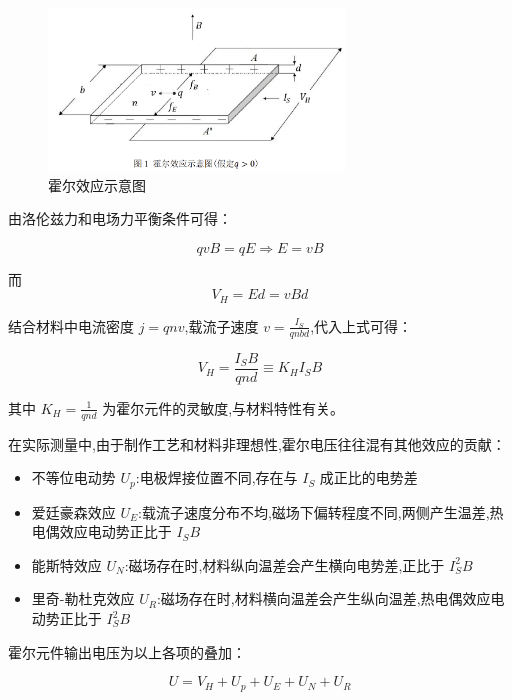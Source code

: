 \documentclass[UTF8]{ctexart}
\begin{document}
    \begin{figure}[htbp]
    \centering
    \includegraphics[width=0.7\textwidth]{hall_effect.png}
    \caption{霍尔效应示意图}
    \label{fig:hall_effect}
    \end{figure}
    
    由洛伦兹力和电场力平衡条件可得：
    
    \begin{equation}
    qvB = qE \Rightarrow E=vB
    \end{equation}
    
    而
    \begin{equation}
    V_H = Ed = vBd
    \end{equation}
    
    结合材料中电流密度 $j=qnv$,载流子速度 $v=\frac{I_S}{qnbd}$,代入上式可得：
    
    \begin{equation}
    V_H = \frac{I_SB}{qnd} \equiv K_HI_SB
    \end{equation}
    
    其中 $K_H=\frac{1}{qnd}$ 为霍尔元件的灵敏度,与材料特性有关。
    
    在实际测量中,由于制作工艺和材料非理想性,霍尔电压往往混有其他效应的贡献：
    \begin{itemize}
      \item 不等位电动势 $U_p$:电极焊接位置不同,存在与 $I_S$ 成正比的电势差
      \item 爱廷豪森效应 $U_E$:载流子速度分布不均,磁场下偏转程度不同,两侧产生温差,热电偶效应电动势正比于 $I_SB$ 
      \item 能斯特效应 $U_N$:磁场存在时,材料纵向温差会产生横向电势差,正比于 $I_S^2B$
      \item 里奇-勒杜克效应 $U_R$:磁场存在时,材料横向温差会产生纵向温差,热电偶效应电动势正比于 $I_S^2B$
    \end{itemize}
    
    霍尔元件输出电压为以上各项的叠加：
    
    \begin{equation}
    U = V_H + U_p + U_E + U_N + U_R
    \end{equation}
    
\end{document}
